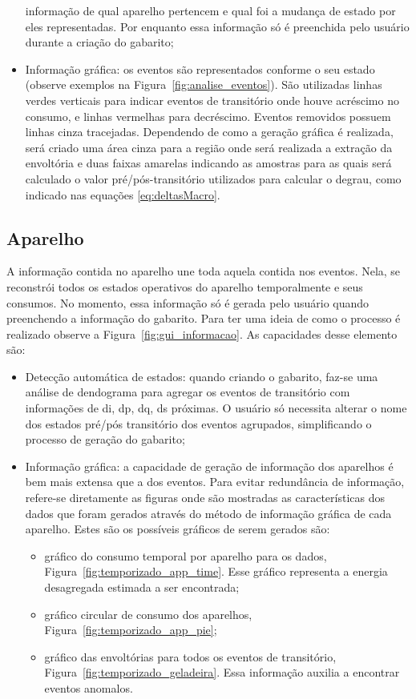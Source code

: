 \begin{itemize}
informação de qual aparelho pertencem e qual foi a mudança de estado
por eles representadas. Por enquanto essa informação só é preenchida
pelo usuário durante a criação do gabarito;
\item Informação gráfica: os eventos são representados conforme o seu
estado (observe exemplos na Figura~\ref{fig:analise_eventos}).
São utilizadas linhas verdes verticais para indicar eventos de
transitório onde houve acréscimo no consumo, e linhas vermelhas para
decréscimo.  Eventos removidos possuem linhas cinza tracejadas.
Dependendo de como a geração gráfica é realizada, será criado uma área
cinza para a região onde será realizada a extração da envoltória e
duas faixas amarelas indicando as amostras para as quais será
calculado o valor pré/pós-transitório utilizados para calcular o
degrau, como indicado nas equações
\ref{eq:deltasMacro}.
\end{itemize}


\subsection{Aparelho}
\label{ssec:aparelho}

A informação contida no aparelho une toda aquela contida nos eventos.
Nela, se reconstrói todos os estados operativos do aparelho
temporalmente e seus consumos. No momento, essa informação só é gerada
pelo usuário quando preenchendo a informação do gabarito. Para ter uma
ideia de como o processo é realizado observe a
Figura~\ref{fig:gui_informacao}. As
capacidades desse elemento são:

\begin{itemize}
\item Detecção automática de estados: quando criando o gabarito,
faz-se uma análise de dendograma para agregar os eventos de
transitório com informações de \acs{di}, \acs{dp}, \acs{dq}, \acs{ds}
próximas. O usuário só necessita alterar o nome dos estados pré/pós
transitório dos eventos agrupados, simplificando o processo de geração
do gabarito;
\item Informação gráfica: a capacidade de geração de informação dos
aparelhos é bem mais extensa que a dos eventos. Para evitar
redundância de informação, refere-se diretamente as figuras onde são
mostradas as características dos dados que foram gerados através do
método de informação gráfica de cada aparelho. Estes são os possíveis 
gráficos de serem gerados são:
\begin{itemize}
\item gráfico do consumo temporal por aparelho para os dados,
Figura~\ref{fig:temporizado_app_time}. Esse gráfico representa a
energia desagregada estimada a ser encontrada;
\item gráfico circular de consumo dos aparelhos,
Figura~\ref{fig:temporizado_app_pie};
\item gráfico das envoltórias para todos os eventos de transitório,
Figura~\ref{fig:temporizado_geladeira}. Essa informação auxilia a
encontrar eventos anomalos.
\end{itemize}
\end{itemize}

